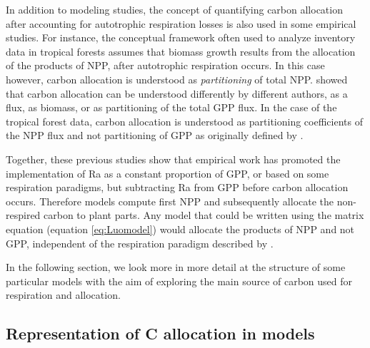 \documentclass[12pt, a4paper]{article}
\begin{document}
In addition to modeling studies, the concept of quantifying carbon allocation after accounting for autotrophic respiration losses is also used in some empirical studies. For instance, the conceptual framework often used to analyze inventory data in tropical forests \citep[e.g.][]{Malhi2011, Malhi2015} assumes that biomass growth results from the allocation of the products of NPP, after autotrophic respiration occurs. In this case however, carbon allocation is understood as \emph{partitioning} of total NPP. \citet{Litton2007} showed that carbon allocation can be understood differently by different authors, as a flux, as biomass, or as partitioning of the total GPP flux. In the case of the tropical forest data, carbon allocation is understood as partitioning coefficients of the NPP flux and not partitioning of GPP as originally defined by \citet{Litton2007}.  

Together, these previous studies show that empirical work has promoted the implementation of Ra as a constant proportion of GPP, or based on some respiration paradigms, but subtracting Ra from GPP before carbon allocation occurs. Therefore models compute first NPP and subsequently allocate the non-respired carbon to plant parts. Any model that could be written using the matrix equation (equation \ref{eq:Luomodel}) would allocate the products of NPP and not GPP, independent of the respiration paradigm described by \citet{Amthor2000}. 

In the following section, we look more in more detail at the structure of some particular models with the aim of exploring the main source of carbon used for respiration and allocation.


\subsection{Representation of C allocation in models} 
\end{document}
